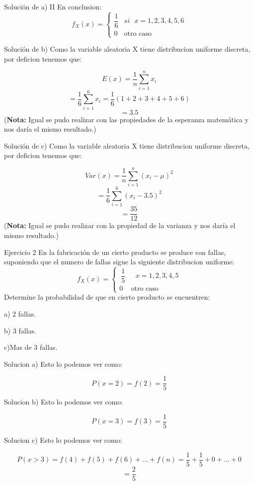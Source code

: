 \documentclass[11pt]{beamer}
\begin{document}
\begin{frame} {Solución de a) II}
En conclusion:
$$
f_{X} (x)=\begin{cases}
{\dfrac{1}{6}} & si \mbox{ $x= 1,2 ,3, 4, 5, 6$}\\{0 }& \mbox{otro caso}\
\end{cases}
$$
\end{frame}

\begin{frame}{Solución de b)}
Como la variable aleatoria X tiene distribucion uniforme discreta, por deficion tenemos que:

        $$E(x)=\dfrac{1}{n}\sum_{i=1}^{n}x_{i}$$
        $$=\dfrac{1}{6}\sum_{i=1}^{6}x_{i}=\dfrac{1}{6}(1+2+3+4+5+6)$$
        $$=3.5$$
(\textbf{Nota:} Igual se pudo realizar con las propiedades de la esperanza matemática y nos daría el mismo resultado.)
\end{frame}
\begin{frame}{Solución de c)}
Como la variable aleatoria X tiene distribucion uniforme discreta, por deficion tenemos que:

        $$Var(x)=\dfrac{1}{n}\sum_{i=1}^{n}(x_{i}-\mu)^{2}$$
        $$=\dfrac{1}{6}\sum_{i=1}^{6}(x_{i}-3.5)^{2}$$
        $$=\dfrac{35}{12}$$
(\textbf{Nota:} Igual se pudo realizar con la propiedad de la varianza y nos daría el mismo resultado.)
\end{frame} 

\begin{frame}{Ejercicio 2}
En la fabricación de un cierto producto se produce con fallas, suponiendo que el numero de fallas sigue la siguiente distribucion uniforme:
$$
f_{X} (x)=\begin{cases}
\ {\dfrac{1}{5}} &\mbox{ $x=1,2,3,4,5$}\\ {0} &\mbox{otro caso}\
\end{cases}
$$
Determine la probabilidad de que en cierto producto se encuentren: 

a) 2 fallas.

b) 3 fallas.

c)Mas de 3 fallas.

\end{frame} 
 
\begin{frame}{Solucion a)}
Esto lo podemos ver como:

$$P(x=2)=f(2)=\frac{1}{5}$$

\end{frame} 

\begin{frame}{Solucion b)}
Esto lo podemos ver como:

$$P(x=3)=f(3)=\frac{1}{5}$$


\end{frame} 

\begin{frame}{Solucion c)}
Esto lo podemos ver como:

$$P(x>3)=f(4)+f(5)+f(6)+...+f(n)=\frac{1}{5}+\frac{1}{5}+0+...+0$$
$$=\frac{2}{5}$$


\end{frame}  
 
\end{document}
